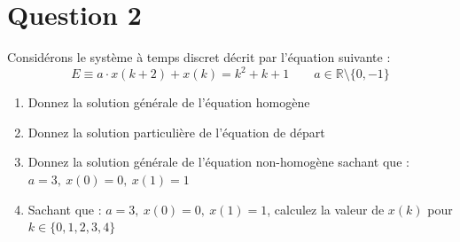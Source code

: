 \documentclass[11pt,a4paper]{report}
\begin{document}
		
		
		
	\pagebreak
	\section*{Question 2}
		Considérons le système à temps discret décrit par l'équation suivante :
		\[
			E \equiv a \cdot x(k+2) + x(k) = k^2 + k + 1 \qquad a \in \mathbb{R} \setminus \{0, -1\}
		\]
		
		\begin{enumerate}
			\item Donnez la solution générale de l'équation homogène
			\item Donnez la solution particulière de l'équation de départ
			\item Donnez la solution générale de l'équation non-homogène sachant que : $a=3,\ x(0) = 0,\ x(1) = 1$
			\item Sachant que : $a=3,\ x(0) = 0,\ x(1) = 1$, calculez la valeur de $x(k)$ pour $k \in \{ 0,1,2,3,4 \}$
		\end{enumerate}
		\pagebreak
		
\end{document}
